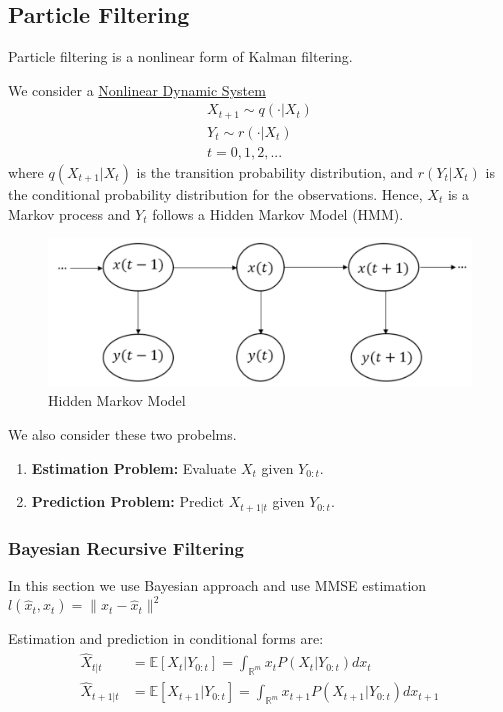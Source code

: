 \documentclass[11pt,a4paper]{article}
\begin{document}
\subsection{Particle Filtering}
Particle filtering is a nonlinear form of Kalman filtering.

We consider a \underline{Nonlinear Dynamic System}
\begin{equation}
    \begin{aligned}
        X_{t+1}\sim q(\cdot|X_t)\\
        Y_{t}\sim r(\cdot|X_t)\\t=0,1,2,...
    \end{aligned}
    \nonumber
\end{equation}
where $q(X_{t+1}|X_t)$ is the transition probability distribution, and $r(Y_t|X_t)$ is the conditional probability distribution for the observations. Hence, $X_t$ is a Markov process and $Y_t$ follows a Hidden Markov Model (HMM).
\begin{center}\begin{figure}[htbp]
    \centering
    \includegraphics[scale=0.2]{HMM.png}
    \caption{Hidden Markov Model}
    \label{}
\end{figure}\end{center}
We also consider these two probelms.
\begin{enumerate}
    \item \textbf{Estimation Problem:} Evaluate $X_t$ given $Y_{0:t}$.
    \item \textbf{Prediction Problem:} Predict $X_{t+1|t}$ given $Y_{0:t}$.
\end{enumerate}

\subsubsection{Bayesian Recursive Filtering}
In this section we use Bayesian approach and use MMSE estimation $l(\hat{x}_t,x_t)=\|x_t-\hat{x}_t\|^2$

Estimation and prediction in conditional forms are:
\begin{equation}
    \begin{aligned}
        \hat{X}_{t|t}&=\mathbb{E}[X_{t}|Y_{0:t}]=\int_{\mathbb{R}^m}x_{t}P(X_{t}|Y_{0:t})dx_{t}\\
        \hat{X}_{t+1|t}&=\mathbb{E}[X_{t+1}|Y_{0:t}]=\int_{\mathbb{R}^m}x_{t+1}P(X_{t+1}|Y_{0:t})dx_{t+1}
    \end{aligned}
    \nonumber
\end{equation}
\end{document}
